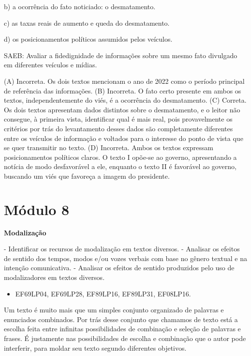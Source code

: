 b) a ocorrência do fato noticiado: o desmatamento.

c) as taxas reais de aumento e queda do desmatamento.

d) os posicionamentos políticos assumidos pelos veículos.

SAEB: Avaliar a fidedignidade de informações sobre um mesmo fato
divulgado em diferentes veículos e mídias.

(A) Incorreta. Os dois textos mencionam o ano de 2022 como o período
principal de referência das informações. (B) Incorreta. O fato certo
presente em ambos os textos, independentemente do viés, é a ocorrência
do desmatamento. (C) Correta. Os dois textos apresentam dados distintos
sobre o desmatamento, e o leitor não consegue, à primeira vista,
identificar qual é mais real, pois provavelmente os critérios por trás
do levantamento desses dados são completamente diferentes entre os
veículos de informação e voltados para o interesse do ponto de vista que
se quer transmitir no texto. (D) Incorreta. Ambos os textos expressam
posicionamentos políticos claros. O texto I opõe-se ao governo,
apresentando a notícia de modo desfavorável a ele, enquanto o texto II é
favorável ao governo, buscando um viés que favoreça a imagem do
presidente.

\hypertarget{muxf3dulo-8}{%
\section{Módulo 8}\label{muxf3dulo-8}}

\textbf{Modalização}


- Identificar os recursos de modalização
em textos diversos. - Analisar os efeitos de sentido dos tempos, modos
e/ou vozes verbais com base no gênero textual e na intenção
comunicativa. - Analisar os efeitos de sentido produzidos pelo uso de
modalizadores em textos diversos.


\begin{itemize}
\tightlist
\item
  EF69LP04, EF69LP28, EF89LP16, EF89LP31, EF08LP16.
\end{itemize}

Um texto é muito mais que um simples conjunto organizado de palavras e
enunciados combinados. Por trás desse conjunto que chamamos de texto
está a escolha feita entre infinitas possibilidades de combinação e
seleção de palavras e frases. É justamente nas possibilidades de escolha
e combinação que o autor pode interferir, para moldar seu texto segundo
diferentes objetivos.

